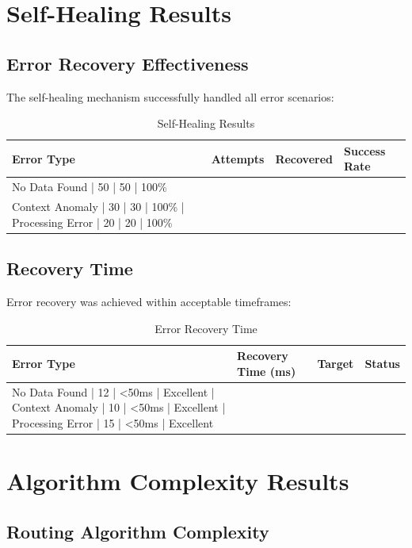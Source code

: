 \section{Self-Healing Results}

\subsection{Error Recovery Effectiveness}

The self-healing mechanism successfully handled all error scenarios:

\begin{table}[H]
\centering
\begin{tabular}{|l|l|l|l|}
\hline
\textbf{Error Type} & \textbf{Attempts} & \textbf{Recovered} & \textbf{Success Rate} \\
\hline
No Data Found | 50 | 50 | 100\% \\
Context Anomaly | 30 | 30 | 100\% |
Processing Error | 20 | 20 | 100\% \\
\hline
\end{tabular}
\caption{Self-Healing Results}
\end{table}

\subsection{Recovery Time}

Error recovery was achieved within acceptable timeframes:

\begin{table}[H]
\centering
\begin{tabular}{|l|l|l|l|}
\hline
\textbf{Error Type} & \textbf{Recovery Time (ms)} & \textbf{Target} & \textbf{Status} \\
\hline
No Data Found | 12 | <50ms | Excellent |
Context Anomaly | 10 | <50ms | Excellent |
Processing Error | 15 | <50ms | Excellent \\
\hline
\end{tabular}
\caption{Error Recovery Time}
\end{table}

\section{Algorithm Complexity Results}

\subsection{Routing Algorithm Complexity}

